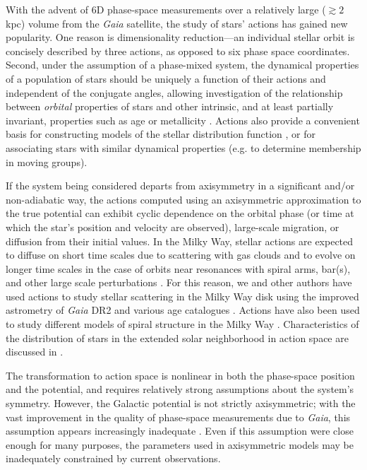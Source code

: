 \documentclass[twocolumn]{aastex62}
\begin{document}
With the advent of 6D phase-space measurements over a relatively large
($\gtrsim 2$ kpc) volume from the {\em Gaia} satellite, the study of stars'
actions has gained new popularity. One reason is dimensionality reduction---an
individual stellar orbit is concisely described by three actions, as opposed
to six phase space coordinates. Second, under the assumption of a phase-mixed
system, the dynamical properties of a population of stars should be uniquely a
function of their actions and independent of the conjugate angles, allowing
investigation of the relationship between {\em orbital} properties of stars
and other intrinsic, and at least partially invariant, properties such as age
or metallicity \citep{2018ApJ...867...31B, 2018arXiv180803278T,
2018MNRAS.481.4093S, 2019arXiv190304030G, 2019arXiv190309320D,
2019MNRAS.486.1167B}. Actions also provide a convenient basis for constructing
models of the stellar distribution function
\citep[e.g.][]{1915MNRAS..76...70J, 1985ApJ...295..388V, 2017ApJ...839...61T},
or for associating stars with similar dynamical properties (e.g. to determine
membership in moving groups).

If the system being considered departs from axisymmetry in a significant
and/or non-adiabatic way, the actions computed using an axisymmetric
approximation to the true potential can exhibit cyclic dependence on the
orbital phase (or time at which the star's position and velocity are
observed), large-scale migration, or diffusion from their initial values. In
the Milky Way, stellar actions are expected to diffuse on short time scales
due to scattering with gas clouds and to evolve on longer time scales in the
case of orbits near resonances with spiral arms, bar(s), and other large scale
perturbations \citep{2014RvMP...86....1S}. For this reason, we and other
authors have used actions to study stellar scattering in the Milky Way disk
using the improved astrometry of {\em Gaia} DR2 and various age catalogues
\citep{2018ApJ...867...31B, 2018arXiv180803278T}. Actions have also been used
to study different models of spiral structure in the Milky Way
\citep{2019MNRAS.tmp..155S}. Characteristics of the distribution of stars in
the extended solar neighborhood in action space are discussed in
\citet{2019MNRAS.484.3291T}.

The transformation to action space is nonlinear in both the phase-space
position and the potential, and requires relatively strong assumptions about
the system's symmetry. However, the Galactic potential is not strictly
axisymmetric; with the vast improvement in the quality of phase-space
measurements due to {\em Gaia}, this assumption appears increasingly
inadequate \citep[e.g.][]{2018Natur.561..360A}. Even if this assumption were
close enough for many purposes, the parameters used in axisymmetric models may
be inadequately constrained by current observations.
\end{document}
